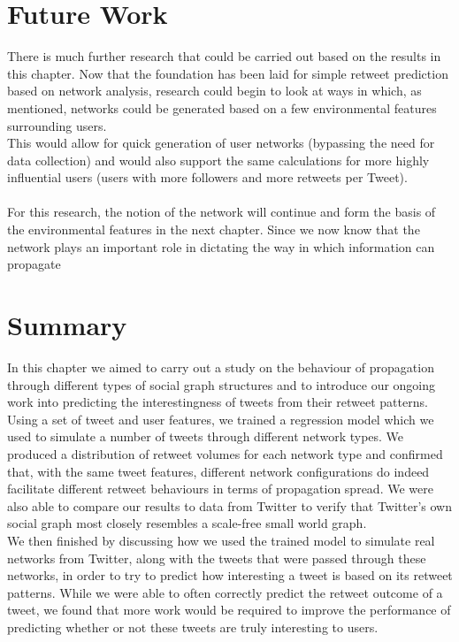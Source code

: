 \section{Future Work}
There is much further research that could be carried out based on the results in this chapter. Now that the foundation has been laid for simple retweet prediction based on network analysis, research could begin to look at ways in which, as mentioned, networks could be generated based on a few environmental features surrounding users.
\\
This would allow for quick generation of user networks (bypassing the need for data collection) and would also support the same calculations for more highly influential users (users with more followers and more retweets per Tweet).
\\ \\
For this research, the notion of the network will continue and form the basis of the environmental features in the next chapter. Since we now know that the network plays an important role in dictating the way in which information can propagate

\section{Summary}
In this chapter we aimed to carry out a study on the behaviour of propagation through different types of social graph structures and to introduce our ongoing work into predicting the interestingness of tweets from their retweet patterns.
\\
Using a set of tweet and user features, we trained a regression model which we used to simulate a number of tweets through different network types. We produced a distribution of retweet volumes for each network type and confirmed that, with the same tweet features, different network configurations do indeed facilitate different retweet behaviours in terms of propagation spread. We were also able to compare our results to data from Twitter to verify that Twitter's own social graph most closely resembles a scale-free small world graph.
\\
We then finished by discussing how we used the trained model to simulate real networks from Twitter, along with the tweets that were passed through these networks, in order to try to predict how interesting a tweet is based on its retweet patterns. While we were able to often correctly predict the retweet outcome of a tweet, we found that more work would be required to improve the performance of predicting whether or not these tweets are truly interesting to users.